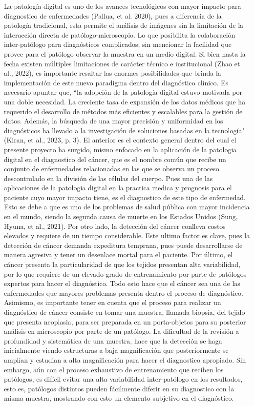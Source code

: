 \documentclass[12pt,letterpaper,final, openany]{scrbook}
\begin{document}
La patología digital es uno de los avances tecnológicos con mayor impacto para diagnostico de enfermedades (Pallua, et al. 2020), pues a diferencia de la patología tradicional, esta permite el análisis de imágenes sin la limitación de la interacción directa de patólogo-microscopio. Lo que posibilita la colaboración inter-patólogo para diagnósticos complicados; sin mencionar la facilidad que provee para el patólogo observar la muestra en un medio digital. Si bien hasta la fecha existen múltiples limitaciones de carácter técnico e institucional (Zhao et al., 2022), es importante resaltar las enormes posibilidades que brinda la implementación de este nuevo paradigma dentro del diagnóstico clínico. Es necesario apuntar que, ``la adopción de la patología digital estuvo motivada por una doble necesidad. La creciente tasa de expansión de los datos médicos que ha requerido el desarrollo de métodos más eficientes y escalables para la gestión de datos. Además, la búsqueda de una mayor precisión y uniformidad en los diagnósticos ha llevado a la investigación de soluciones basadas en la tecnología" (Kiran, et al., 2023, p. 3). El anterior es el contexto general dentro del cual el presente proyecto ha surgido, mismo enfocado en la aplicación de la patologia digital en el diagnostico del cáncer, que es el nombre común que recibe un conjunto de enfermedades relacionadas en las que se observa un proceso descontrolado en la división de las células del cuerpo. Pues una de las aplicaciones de la patologia digital en la practica medica y prognosis para el paciente cuyo mayor impacto tiene, es el diagnostico de este tipo de enfermedad. Esto se debe a que es uno de los problemas de salud pública con mayor incidencia en el mundo, siendo la segunda causa de muerte en los Estados Unidos (Sung, Hyuna, et al., 2021). Por otro lado, la detección del cáncer conlleva costos elevados y requiere de un tiempo considerable. Este ultimo factor es clave, pues la detección de cáncer demanda expeditura temprana, pues puede desarrollarse de manera agresiva y tener un desenlace mortal para el paciente. Por último, el cáncer presenta la particularidad de que los tejidos presentan alta variabilidad, por lo que requiere de un elevado grado de entrenamiento por parte de patólogos expertos para hacer el diagnóstico. Todo esto hace que el cáncer sea una de las enfermedades que mayores problemas presenta dentro el proceso de diagnóstico.
\\
Asimismo, es importante tener en cuenta que el proceso para realizar un diagnóstico de cáncer consiste en tomar una muestra, llamada biopsia, del tejido que presenta neoplasia, para ser preparada en un porta-objetos para su posterior análisis en microscopio por parte de un patólogo. La dificultad de la revisión a profundidad y sistemática de una muestra, hace que la detección se haga inicialmente viendo estructuras a baja magnificación que posteriormente se amplían y estudian a alta magnificación para hacer el diagnostico apropiado. Sin embargo, aún con el proceso exhaustivo de entrenamiento que reciben los patólogos, es difícil evitar una alta variabilidad inter-patólogo en los resultados, esto es, patólogos distintos pueden fácilmente diferir en su diagnostico con la misma muestra, mostrando con esto un elemento subjetivo en el diagnóstico. 
\end{document}

